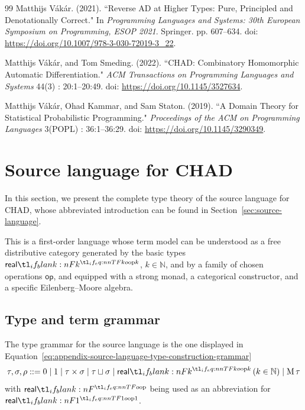 \documentclass[11pt,a4paper]{article}
\theoremstyle{definition}
\theoremstyle{remark}
\providecommand{\N}{\mathbb{N}}
\providecommand{\srcop}{\mathsf{op}}
\begin{document}
\begin{thebibliography}{99}
Matthijs Vákár. (2021). ``Reverse AD at Higher Types: Pure, Principled and Denotationally Correct." In \emph{Programming Languages and Systems: 30th European Symposium on Programming, ESOP 2021}. Springer. pp. 607--634. doi: \url{https://doi.org/10.1007/978-3-030-72019-3_22}.

Matthijs Vákár, and Tom Smeding. (2022). ``CHAD: Combinatory Homomorphic Automatic Differentiation." \emph{ACM Transactions on Programming Languages and Systems} 44(3) : 20:1--20:49. doi: \url{https://doi.org/10.1145/3527634}.

Matthijs Vákár, Ohad Kammar, and Sam Staton. (2019). ``A Domain Theory for Statistical Probabilistic Programming." \emph{Proceedings of the ACM on Programming Languages} 3(POPL) : 36:1--36:29. doi: \url{https://doi.org/10.1145/3290349}.
\end{thebibliography}


\clearpage
\appendix
\section{Source language for CHAD}
\label{sec:appendix-source-language-for-chad}


In this section, we present the complete type theory of the source language for CHAD, whose abbreviated introduction can be found in Section~\ref{sec:source-language}.

This is a first-order language whose term model can be understood as a free distributive category generated by the basic types \( \srcreal[k] \), \( k \in \N \), and by a family of chosen operations \( \srcop \), and equipped with a strong monad, a categorical constructor, and a specific Eilenberg--Moore algebra.

\subsection{Type and term grammar}

The type grammar for the source language is the one displayed in Equation~\ref{eq:appendix-source-language-type-construction-grammar}
\begin{equation}
  \label{eq:appendix-source-language-type-construction-grammar}
  \tau, \sigma, \rho
  ::=
  0
  \mid
  1
  \mid
  \tau \times \sigma
  \mid
  \tau \sqcup \sigma
  \mid
  \srcreal[k] \left( k \in \N \right)
  \mid
  \opn[b]{M} \tau
\end{equation}
with \( \srcreal \) being used as an abbreviation for \( \srcreal[1] \).
\end{document}
